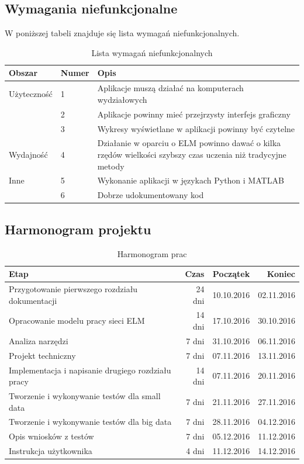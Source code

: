 \documentclass{article}
\begin{document}
\subsection{Wymagania niefunkcjonalne}
W poniższej tabeli znajduje się lista wymagań niefunkcjonalnych.
\begin{table}[H]
\caption{Lista wymagań niefunkcjonalnych}
\begin{tabular}{|l|l|p{9.4cm}|}
\hline
\textbf{Obszar} & \textbf{Numer} & \textbf{Opis} \\
\hline
Użyteczność & 1 & Aplikacje muszą działać na komputerach wydziałowych \\
 & 2 & Aplikacje powinny mieć przejrzysty interfejs graficzny \\
 & 3 & Wykresy wyświetlane w aplikacji powinny być czytelne \\
\hline
Wydajność & 4 & Działanie w oparciu o ELM powinno dawać o kilka rzędów wielkości szybszy czas uczenia niż tradycyjne metody \\
\hline 
Inne & 5 & Wykonanie aplikacji w językach Python i MATLAB \\
& 6 & Dobrze udokumentowany kod \\
\hline
\end{tabular}
\end{table}

\subsection{Harmonogram projektu}
\begin{table}[H]
\caption{Harmonogram prac}
\begin{tabular}{|l|r|r|r|}
\hline
\textbf{Etap} & \textbf{Czas} & \textbf{Początek} & \textbf{Koniec} \\
\hline
Przygotowanie pierwszego rozdziału dokumentacji & 24 dni & 10.10.2016 & 02.11.2016 \\
Opracowanie modelu pracy sieci ELM & 14 dni & 17.10.2016 & 30.10.2016 \\
Analiza narzędzi & 7 dni & 31.10.2016 & 06.11.2016 \\
Projekt techniczny & 7 dni & 07.11.2016 & 13.11.2016 \\
Implementacja i napisanie drugiego rozdziału pracy & 14 dni & 07.11.2016 & 20.11.2016 \\
Tworzenie i wykonywanie testów dla small data & 7 dni & 21.11.2016 & 27.11.2016 \\
Tworzenie i wykonywanie testów dla big data & 7 dni & 28.11.2016 & 04.12.2016 \\
Opis wniosków z testów & 7 dni & 05.12.2016 & 11.12.2016 \\
Instrukcja użytkownika & 4 dni & 11.12.2016 & 14.12.2016 \\
\hline
\end{tabular}
\end{table}
\end{document}
